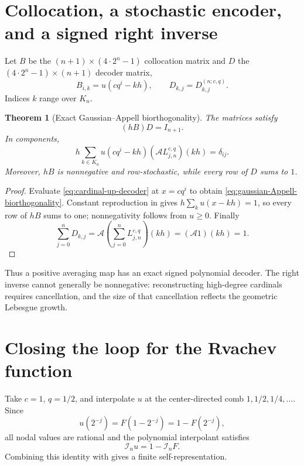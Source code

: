 \documentclass[11pt,oneside]{book}
\numberwithin{equation}{chapter}
\newtheorem{theorem}{Theorem}[chapter]
\theoremstyle{definition}
\theoremstyle{remark}
\newcommand{\App}{\mathcal A}
\newcommand{\Interp}{\mathcal I}
\begin{document}
\section{Collocation, a stochastic encoder, and a signed right inverse}

Let $B$ be the $(n+1)\times(4\cdot2^n-1)$ collocation matrix and $D$ the
$(4\cdot2^n-1)\times(n+1)$ decoder matrix,
\begin{equation}
 B_{i,k}=u(cq^i-kh),
 \qquad
 D_{k,j}=D_{k,j}^{(n;c,q)}.
 \label{eq:BD-definition}
\end{equation}
Indices $k$ range over $K_n$.

\begin{theorem}[Exact Gaussian--Appell biorthogonality]
\label{thm:gaussian-Appell-biorthogonality}
The matrices satisfy
\begin{equation}
 \boxed{(hB)D=I_{n+1}.}
 \label{eq:stochastic-right-inverse}
\end{equation}
In components,
\begin{equation}
 h\sum_{k\in K_n}
 u(cq^i-kh)(\App L_{j,n}^{c,q})(kh)=\delta_{ij}.
 \label{eq:gaussian-Appell-biorthogonality}
\end{equation}
Moreover, $hB$ is nonnegative and row-stochastic, while every row of $D$
sums to $1$.
\end{theorem}

\begin{proof}
Evaluate \eqref{eq:cardinal-up-decoder} at $x=cq^i$ to obtain
\eqref{eq:gaussian-Appell-biorthogonality}.  Constant reproduction in
 gives
$h\sum_ku(x-kh)=1$, so every row of $hB$ sums to one; nonnegativity follows
from $u\ge0$.  Finally
\[
 \sum_{j=0}^{n}D_{k,j}
 =\App\!\left(\sum_{j=0}^{n}L_{j,n}^{c,q}\right)(kh)
 =(\App1)(kh)=1.
\]
\end{proof}

Thus a positive averaging map has an exact signed polynomial decoder.  The
right inverse cannot generally be nonnegative: reconstructing high-degree
cardinals requires cancellation, and the size of that cancellation reflects
the geometric Lebesgue growth.

\section{Closing the loop for the Rvachev function}

Take $c=1$, $q=1/2$, and interpolate $u$ at the center-directed comb
$1,1/2,1/4,\ldots$.  Since
\begin{equation}
 u(2^{-j})=F(1-2^{-j})=1-F(2^{-j}),
 \label{eq:up-center-comb-values}
\end{equation}
all nodal values are rational and the polynomial interpolant satisfies
\begin{equation}
 \Interp_nu=1-\Interp_nF.
 \label{eq:up-fabius-interpolant-relation}
\end{equation}
Combining this identity with
 gives a finite self-representation.
\end{document}
